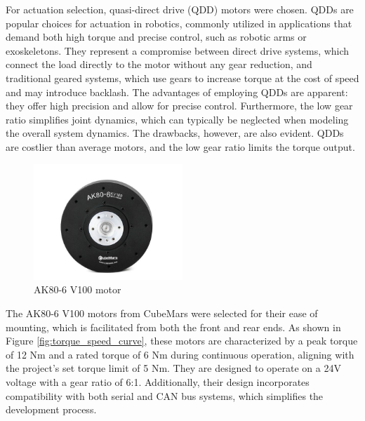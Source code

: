 For actuation selection, quasi-direct drive (QDD) motors were chosen. QDDs are popular choices for actuation in robotics, commonly utilized in applications that demand both high torque and precise control, such as robotic arms or exoskeletons. They represent a compromise between direct drive systems, which connect the load directly to the motor without any gear reduction, and traditional geared systems, which use gears to increase torque at the cost of speed and may introduce backlash. The advantages of employing QDDs are apparent: they offer high precision and allow for precise control. Furthermore, the low gear ratio simplifies joint dynamics, which can typically be neglected when modeling the overall system dynamics. The drawbacks, however, are also evident. QDDs are costlier than average motors, and the low gear ratio limits the torque output.

\begin{figure}[H]
  \centering
  \includegraphics[width=0.5\textwidth]{figures/hardware_setup/motor.jpg}
  \caption{AK80-6 V100 motor\cite{cubemarsAK806}}
  \label{fig:AK80-6}
\end{figure}

The AK80-6 V100 motors from CubeMars were selected for their ease of mounting, which is facilitated from both the front and rear ends\cite{cubemarsAK806}. As shown in Figure \ref{fig:torque_speed_curve}, these motors are characterized by a peak torque of 12 Nm and a rated torque of 6 Nm during continuous operation, aligning with the project's set torque limit of 5 Nm. They are designed to operate on a 24V voltage with a gear ratio of 6:1. Additionally, their design incorporates compatibility with both serial and CAN bus systems, which simplifies the development process.

